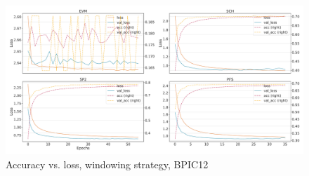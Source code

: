\begin{figure}[!htb]
    \centering
    \includegraphics[width=\textwidth]{gfx/bpic2012/windowed_loss_acc_curve.pdf}
    \caption{Accuracy vs. loss, windowing strategy, BPIC12}
\end{figure}
\FloatBarrier

